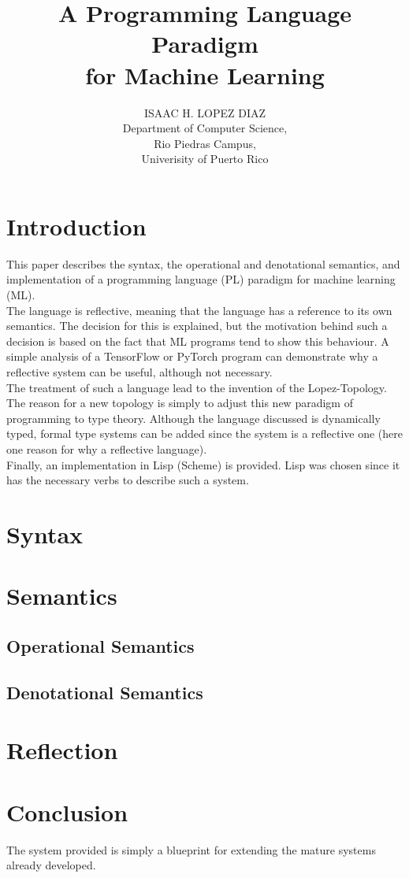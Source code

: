 \documentclass{article}
\title{A Programming Language Paradigm \\ for Machine Learning}
\author{ISAAC H. LOPEZ DIAZ \\
  Department of Computer Science, \\
  Rio Piedras Campus, \\
  Univerisity of Puerto Rico}
\begin{document}
\maketitle
\section{Introduction}
This paper describes the syntax, the operational and denotational semantics, and implementation
of a programming language (PL) paradigm for machine learning (ML). \\

The language is reflective, meaning that the language has a reference to its own semantics. The decision for this is explained, but the motivation
behind such a decision is based on the fact that ML programs tend to show this behaviour. A simple analysis of a TensorFlow or PyTorch program
can demonstrate why a reflective system can be useful, although not necessary. \\

The treatment of such a language lead to the invention of the Lopez-Topology. The reason for a new topology is simply to adjust this
new paradigm of programming to type theory. Although the language discussed is dynamically typed, formal type systems can be
added since the system is a reflective one (here one reason for why a reflective language). \\

Finally, an implementation in Lisp (Scheme) is provided. Lisp was chosen since it has the necessary verbs
to describe such a system.

\section{Syntax}

\section{Semantics}

\subsection{Operational Semantics}

\subsection{Denotational Semantics}

\section{Reflection}

\section{Conclusion}
The system provided is simply a blueprint for extending the mature systems already developed. 

\nocite*{}


\end{document}
